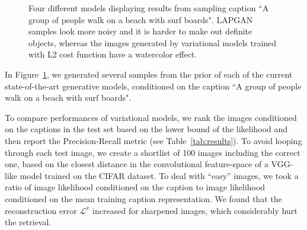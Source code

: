 \documentclass{article} %
\newcommand{\rloss}{\mathcal{L}^{x}}
\begin{document}
\vspace{-0.5cm}
\begin{figure}[!h]
\captionsetup[subfigure]{labelformat=empty}
\begin{center}
\quad
%
\quad
%
\quad
%
\quad
%
\end{center}
\caption{Four different models displaying results from sampling caption ``A group of people walk on a beach with surf boards". LAPGAN samples look more noisy and it is harder to make out definite objects, whereas the images generated by variational models trained with L2 cost function have a watercolor effect.}
\label{fig:diffmodels}
\vspace{-0.4cm}
\end{figure}

In Figure~\ref{fig:diffmodels}, we generated several samples from the prior of each of the current state-of-the-art generative models, conditioned on the caption ``A group of people walk on a beach with surf boards".

To compare performances of variational models, we rank the images conditioned on the captions in the test set based on the lower bound of the likelihood and then report the Precision-Recall metric (see Table~\ref{tab:results}). To avoid looping through each test image, we create a shortlist of 100 images including the correct one, based on the closest distance in the convolutional feature-space of a VGG-like model trained on the CIFAR dataset. To deal with ``easy'' images, we took a ratio of image likelihood conditioned on the caption to image likelihood conditioned on the mean training caption representation. We found that the reconstruction error $\rloss$ increased for sharpened images, which considerably hurt the retrieval.
\end{document}
